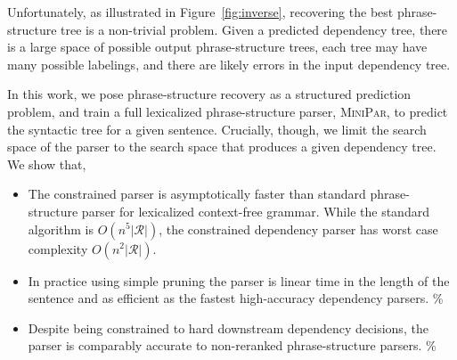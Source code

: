 \documentclass[11pt,letterpaper]{article}
\newcommand{\rules}{\mathcal{R}}
\begin{document}

Unfortunately, as illustrated in Figure~\ref{fig:inverse},
recovering the best phrase-structure tree is a non-trivial problem. Given a
predicted dependency tree, there is a large space of possible output
phrase-structure trees, each tree may have many possible labelings,
and there are likely errors in the input dependency tree.







In this work, we pose phrase-structure recovery as a structured
prediction problem, and train a full lexicalized phrase-structure
parser, \textsc{MiniPar},  to predict the syntactic tree for a given sentence. Crucially,
though, we limit the search space of the parser to the search space
that produces a given dependency tree. We show that,





\begin{itemize}
\item The constrained parser is asymptotically  faster than
standard phrase-structure parser for lexicalized context-free grammar.
While the standard algorithm is $O(n^5 |\rules|)$, the
constrained dependency parser has worst case complexity $O(n^2 |\rules|)$.

\item In practice using simple pruning the parser is
linear time in the length of the sentence and as efficient as the fastest
high-accuracy dependency parsers. \%

\item Despite being constrained to hard downstream dependency decisions,
the parser is comparably accurate to non-reranked phrase-structure parsers. \%



\end{itemize}
\end{document}
